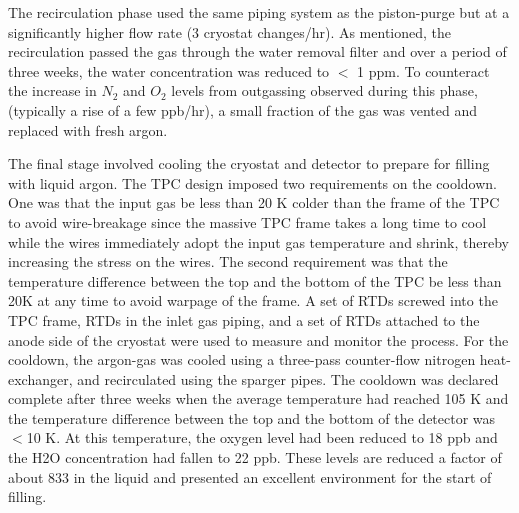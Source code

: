 The recirculation phase used the same piping system as the piston-purge but at a significantly higher flow rate (3 cryostat changes/hr). As mentioned, the recirculation passed the gas through the water removal filter and over a period of three weeks, the water concentration was reduced to $<$ 1 ppm. To counteract the increase in $N_2$ and $O_2$ levels from outgassing observed during this phase, (typically a rise of a few ppb/hr), a small fraction of the gas was vented and replaced with fresh argon. 

The final stage involved cooling the cryostat and detector to prepare for filling with liquid argon. The TPC design imposed two requirements on the cooldown. One was that  the input gas be less than 20 K colder than the frame of the TPC to avoid wire-breakage since the massive TPC frame takes a long time to cool while the wires immediately adopt the input gas temperature and shrink,  thereby increasing the stress on the wires.  The second requirement was that the temperature difference between the top and the bottom of the TPC be less than 20K at any time to avoid warpage of the frame.  A set of RTDs screwed into the TPC frame, RTDs in the inlet gas piping, and a set of RTDs attached to the anode side of the cryostat were used to measure and monitor the process. For the cooldown, the argon-gas was cooled using a three-pass counter-flow nitrogen heat-exchanger, and recirculated using the sparger pipes. The cooldown was declared complete after three weeks when the average temperature had reached 105 K and the temperature difference between the top and the bottom of the detector was $<$10 K. At this temperature, the oxygen level had been reduced to 18 ppb and the H2O concentration had fallen to 22 ppb. These levels are reduced a factor of about 833 in the liquid and presented an excellent environment for the start of filling.

